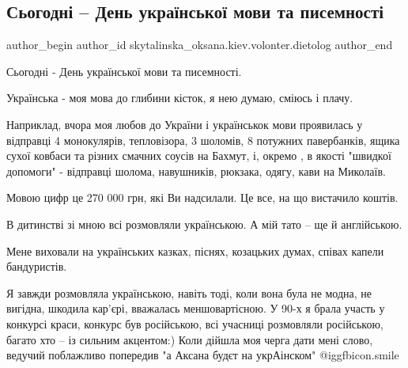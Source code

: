  
 
 
 
 
 
\subsection{Сьогодні -- День української мови та писемності}
\label{sec:09_11_2022.fb.skytalinska_oksana.kiev.volonter.dietolog.1.den_ukrmovy}
 
\ifcmt
 author_begin
   author_id skytalinska_oksana.kiev.volonter.dietolog
 author_end
\fi

Сьогодні - День української мови та писемності.

Українська - моя мова до глибини кісток, я нею думаю, сміюсь і плачу.

Наприклад, вчора моя любов до України і українськок мови проявилась у відправці
4 монокулярів, тепловізора, 3 шоломів, 8 потужних павербанків, ящика сухої
ковбаси та різних смачних соусів на Бахмут, і, окремо , в якості "швидкої
допомоги" - відправці шолома, навушників, рюкзака, одягу, кави на Миколаїв. 

Мовою цифр це 270 000 грн, які Ви надсилали.  Це все, на що вистачило коштів.

В дитинстві зі мною всі розмовляли українською. А мій тато -- ще й англійською.

Мене виховали на українських казках, піснях, козацьких думах, співах капели
бандуристів.

Я завжди розмовляла українською, навіть тоді, коли вона була не модна, не
вигідна, шкодила кар'єрі,  вважалась меншовартісною. У 90-х я брала участь у
конкурсі краси, конкурс був російською, всі учасниці розмовляли російською,
багато хто -- із сильним акцентом:) Коли дійшла моя черга дати мені слово,
ведучий поблажливо попередив "а Аксана будєт на укрАінском" @igg{fbicon.smile} 

